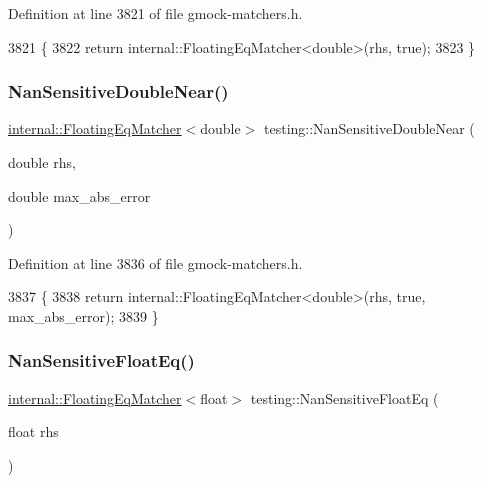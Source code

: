 Definition at line 3821 of file gmock-\/matchers.\+h.


\begin{DoxyCode}
3821                                                                           \{
3822   \textcolor{keywordflow}{return} internal::FloatingEqMatcher<double>(rhs, \textcolor{keyword}{true});
3823 \}
\end{DoxyCode}
\mbox{\label{namespacetesting_a3caa8177ef48150d0dde3a54b0961f7f}} 
\subsubsection{\texorpdfstring{Nan\+Sensitive\+Double\+Near()}{NanSensitiveDoubleNear()}}
{\footnotesize\ttfamily \hyperlink{classtesting_1_1internal_1_1FloatingEqMatcher}{internal\+::\+Floating\+Eq\+Matcher}$<$double$>$ testing\+::\+Nan\+Sensitive\+Double\+Near (\begin{DoxyParamCaption}\item[{double}]{rhs,  }\item[{double}]{max\+\_\+abs\+\_\+error }\end{DoxyParamCaption})\hspace{0.3cm}{\ttfamily [inline]}}



Definition at line 3836 of file gmock-\/matchers.\+h.


\begin{DoxyCode}
3837                                       \{
3838   \textcolor{keywordflow}{return} internal::FloatingEqMatcher<double>(rhs, \textcolor{keyword}{true}, max\_abs\_error);
3839 \}
\end{DoxyCode}
\mbox{\label{namespacetesting_ab3653439a654b85bdccff46d1436670d}} 
\subsubsection{\texorpdfstring{Nan\+Sensitive\+Float\+Eq()}{NanSensitiveFloatEq()}}
{\footnotesize\ttfamily \hyperlink{classtesting_1_1internal_1_1FloatingEqMatcher}{internal\+::\+Floating\+Eq\+Matcher}$<$float$>$ testing\+::\+Nan\+Sensitive\+Float\+Eq (\begin{DoxyParamCaption}\item[{float}]{rhs }\end{DoxyParamCaption})\hspace{0.3cm}{\ttfamily [inline]}}



